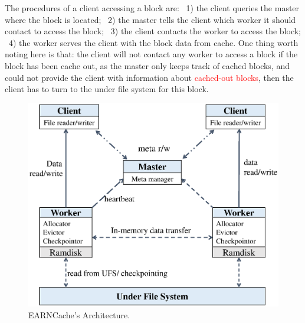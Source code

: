 The procedures of a client accessing a block are: ~1) the client queries the master where the block is located; ~2) the master tells the client which worker it should contact to access the block; ~3) the client contacts the worker to access the block; ~4) the worker serves the client with the block data from cache. One thing worth noting here is that: the client will not contact any worker to access a block if the block has been cache out, as the master only keeps track of cached blocks, and could not provide the client with information about \textcolor{red}{cached-out blocks}, then the client has to turn to the under file system for this block.


\begin{figure}[!htbp]
\centering
\includegraphics[scale=0.4]{figures/architecture.eps}
\caption{EARNCache's Architecture.}
\label{fig:Arch}
\end{figure}


